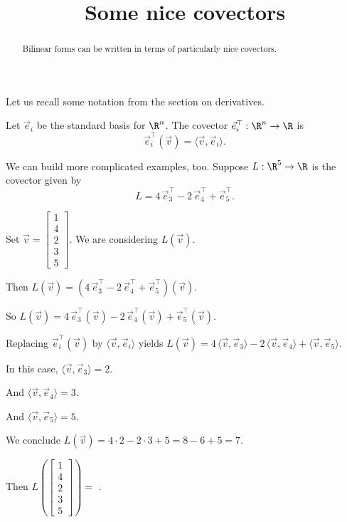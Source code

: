 \documentclass{ximera}
\title{Some nice covectors}
\begin{document}
\begin{abstract}
  Bilinear forms can be written in terms of particularly nice covectors.
\end{abstract}	

Let us recall some notation from the section on derivatives.
	
Let $\vec{e}_i$ be the standard basis for $\R^n$.  The covector $\vec{e}_i^\top : \R^n \to \R$ is 
$$
\vec{e}_i^\top(\vec{v}) = \langle \vec{v}, \vec{e}_i \rangle.
$$
\begin{question}
  We can build more complicated examples, too.  Suppose $L : \R^5 \to \R$ is the covector given by
  $$
  L = 4 \, \vec{e}_3^\top - 2 \, \vec{e}_4^\top + \vec{e}_5^\top.
  $$
  \begin{solution}
    \begin{hint}
      Set $\vec{v} = \begin{bmatrix} 1 \\ 4 \\ 2 \\ 3 \\ 5 \end{bmatrix}$.  We are considering $L(\vec{v})$.
    \end{hint}
    \begin{hint}
      Then $L(\vec{v}) = (4 \, \vec{e}_3^\top - 2 \, \vec{e}_4^\top + \vec{e}_5^\top)(\vec{v})$.
    \end{hint}
    \begin{hint}
      So $L(\vec{v}) = 4 \, \vec{e}_3^\top(\vec{v}) - 2 \, \vec{e}_4^\top(\vec{v}) + \vec{e}_5^\top(\vec{v})$.
    \end{hint}
    \begin{hint}
      Replacing $\vec{e}_i^\top(\vec{v})$ by $\langle \vec{v}, \vec{e}_i \rangle$ yields $L(\vec{v}) = 4 \, \langle \vec{v}, \vec{e}_3 \rangle - 2 \, \langle \vec{v}, \vec{e}_4 \rangle + \langle \vec{v}, \vec{e}_5 \rangle$.
    \end{hint}
    \begin{hint}
      In this case, $\langle \vec{v}, \vec{e}_3 \rangle = 2$.
    \end{hint}
    \begin{hint}
      And $\langle \vec{v}, \vec{e}_4 \rangle = 3$.
    \end{hint}
    \begin{hint}
      And $\langle \vec{v}, \vec{e}_5 \rangle = 5$.
    \end{hint}
    \begin{hint}
      We conclude $L(\vec{v}) = 4 \cdot 2 - 2 \cdot 3 + 5 = 8 - 6 + 5 = 7$.
    \end{hint}
    Then $L\left( \begin{bmatrix} 1 \\ 4 \\ 2 \\ 3 \\ 5 \end{bmatrix} \right) = $ .
  \end{solution}


\end{question}
\end{document}
